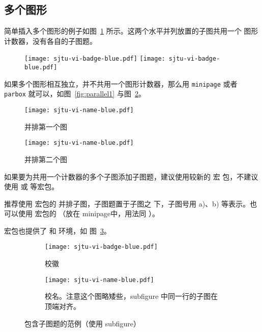 \subsection{多个图形}

简单插入多个图形的例子如图~\ref{fig:SRR} 所示。这两个水平并列放置的子图共用一个
图形计数器，没有各自的子图题。

\begin{figure}[!htp]
  \centering
  \texttt{[image: sjtu-vi-badge-blue.pdf]}
  \hspace{1cm}
  \texttt{[image: sjtu-vi-badge-blue.pdf]}
  \label{fig:SRR}
\end{figure}

如果多个图形相互独立，并不共用一个图形计数器，那么用 \texttt{minipage} 或者
\texttt{parbox} 就可以，如图~\ref{fig:parallel1} 与图~\ref{fig:parallel2}。

\begin{figure}[!htp]
  \centering
  \begin{minipage}{0.48\textwidth}
    \centering
    \texttt{[image: sjtu-vi-name-blue.pdf]}
    \caption{并排第一个图}
    \label{fig:parallel1}
  \end{minipage}\hfill
  \begin{minipage}{0.48\textwidth}
    \centering
    \texttt{[image: sjtu-vi-name-blue.pdf]}
    \caption{并排第二个图}
    \label{fig:parallel2}
  \end{minipage}
\end{figure}

如果要为共用一个计数器的多个子图添加子图题，建议使用较新的 宏
包，不建议使用  或  等宏包。

推荐使用  宏包的  并排子图，子图题置于子图之
下，子图号用 a)、b) 等表示。也可以使用  宏包的 
（放在 minipage中，用法同 ）。

 宏包也提供了  和  环境，如
图~\ref{fig:subfigure}。

\begin{figure}[!htp]
  \centering
  \begin{subfigure}{0.3\textwidth}
    \centering
    \texttt{[image: sjtu-vi-badge-blue.pdf]}
    \caption{校徽}
  \end{subfigure}
  \hspace{1cm}
  \begin{subfigure}{0.4\textwidth}
    \centering
    \texttt{[image: sjtu-vi-name-blue.pdf]}
    \caption{校名。注意这个图略矮些，subfigure 中同一行的子图在顶端对齐。}
  \end{subfigure}
  \caption{包含子图题的范例（使用 subfigure）}
  \label{fig:subfigure}
\end{figure}

